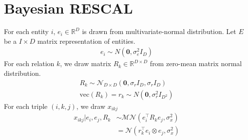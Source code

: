 \section{Bayesian RESCAL}

For each entity $i$, $e_i \in \mathbb{R}^{D}$ is drawn from multivariate-normal distribution. Let $E$ be a $I \times D$ matrix representation of entities.
\begin{align}
\label{eqn:entity_gen}
e_i \sim {N}(\mathbf{0}, \sigma_e^2{I}_D)
\end{align}
For each relation $k$, we draw matrix $R_k \in \mathbb{R}^{D\times D}$ from zero-mean matrix normal distribution.
\begin{align}
\label{eqn:relation_gen}
R_k \sim \mathcal{N}_{D \times D}(\mathbf{0}, \sigma_r{I}_D, \sigma_r{I}_D) \\
\text{vec}(R_k) = r_k \sim N(\mathbf{0}, \sigma_r^2 I_{D^2})
\end{align}
For each triple $(i,k,j)$, we draw $x_{ikj}$
\begin{align}
\label{eqn:triple_gen}
x_{ikj} |e_i, e_j, R_k &\sim \mathcal{MN}(e_i^{\top} R_k e_j, \sigma_x^2)\\
& = \mathcal{N}(r_k^{\top} e_i \otimes e_j, \sigma_x^2)
\end{align}





